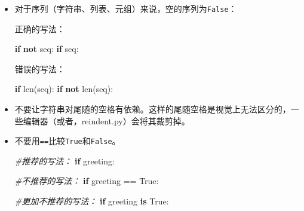 \documentclass[ignorenonframetext,9pt]{beamer}
\newenvironment{Shaded}{}{}
\newcommand{\BuiltInTok}[1]{#1}
\newcommand{\CommentTok}[1]{\textcolor[rgb]{0.38,0.63,0.69}{\textit{#1}}}
\newcommand{\ControlFlowTok}[1]{\textcolor[rgb]{0.00,0.44,0.13}{\textbf{#1}}}
\newcommand{\KeywordTok}[1]{\textcolor[rgb]{0.00,0.44,0.13}{\textbf{#1}}}
\newcommand{\NormalTok}[1]{#1}
\newcommand{\OperatorTok}[1]{\textcolor[rgb]{0.40,0.40,0.40}{#1}}
\newcommand{\VariableTok}[1]{\textcolor[rgb]{0.10,0.09,0.49}{#1}}
\begin{document}
\begin{frame}[fragile]

\begin{itemize}
\item
  对于序列（字符串、列表、元组）来说，空的序列为\texttt{False}：

  正确的写法：

\begin{Shaded}
\begin{Highlighting}[]
\ControlFlowTok{if} \KeywordTok{not}\NormalTok{ seq:}
\ControlFlowTok{if}\NormalTok{ seq:}
\end{Highlighting}
\end{Shaded}

  错误的写法：

\begin{Shaded}
\begin{Highlighting}[]
\ControlFlowTok{if} \BuiltInTok{len}\NormalTok{(seq):}
\ControlFlowTok{if} \KeywordTok{not} \BuiltInTok{len}\NormalTok{(seq):}
\end{Highlighting}
\end{Shaded}
\item
  不要让字符串对尾随的空格有依赖。这样的尾随空格是视觉上无法区分的，一些编辑器（或者，reindent.py）会将其裁剪掉。
\end{itemize}

\end{frame}

\begin{frame}[fragile]

\begin{itemize}
\item
  不要用\texttt{==}比较\texttt{True}和\texttt{False}。

\begin{Shaded}
\begin{Highlighting}[]
\CommentTok{#推荐的写法：}
\ControlFlowTok{if}\NormalTok{ greeting:}

\CommentTok{#不推荐的写法：}
\ControlFlowTok{if}\NormalTok{ greeting }\OperatorTok{==} \VariableTok{True}\NormalTok{:}

\CommentTok{#更加不推荐的写法：}
\ControlFlowTok{if}\NormalTok{ greeting }\KeywordTok{is} \VariableTok{True}\NormalTok{:}
\end{Highlighting}
\end{Shaded}
\end{itemize}

\end{frame}
\end{document}
